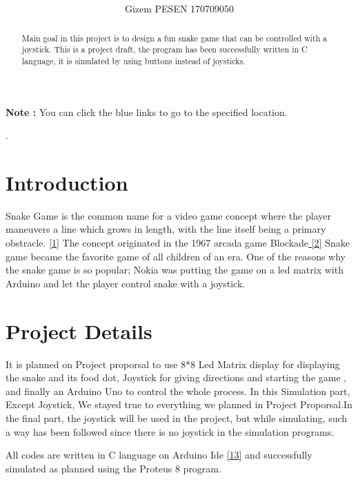 \documentclass[onecolumn]{article}
\title{\spacecaps{CENG 3006 Introduction to Embedded Systems \\ Snake Game }
\color{blue!75!black}
\normalsize
\spacesc{} }
\author{ Gizem PESEN 170709050\\}
\begin{document}
\maketitle
\begin{abstract}
 Main goal in this project is to design a fun snake game that can be controlled with a joystick. This is a project draft, the program has been successfully written in C language, it is simulated by using buttons instead of joysticks.
    
\end{abstract}

\textbf{Note :} You can click the blue links to go to the specified location.

\tableofcontents
.
\section{Introduction}

Snake Game is the common name for a video game concept where the player maneuvers a line which grows in length, with the line itself being a primary obstracle. \href{https://en.wikipedia.org/wiki/Snake_(video_game_genre)}{{[1]}} The concept originated in the 1967 {arcada game Blockade\href{https://en.wikipedia.org/wiki/Arcade_game}{ [2]}} Snake game became the favorite game of all children of an era. One of the reasons why the snake game is so popular; Nokia was putting the game on a led matrix with Arduino and let the player control snake with a joystick.  

\section{Project Details}

It is planned on Project proporsal to use 8*8 Led Matrix display for displaying the snake and its food dot, Joystick for giving directions and starting the game , and finally an Arduino Uno to control the whole process. In this Simulation part, Except Joystick, We stayed true to everything we planned in Project Proporsal.In the final part, the joystick will be used in the project, but while simulating, such a way has been followed since there is no joystick in the simulation programs.

All codes are written in C language on Arduino Ide  \href{https://www.arduino.cc/en/software}{ {[13]}} and successfully simulated as planned using the Proteus 8 program.
\end{document}
